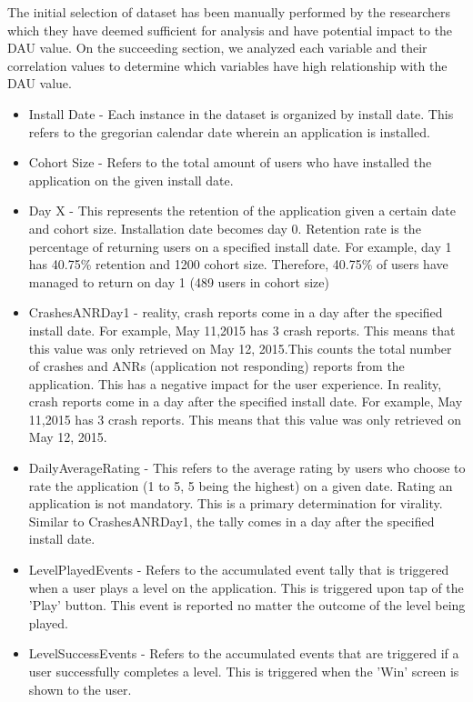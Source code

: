 The initial selection of dataset has been manually performed by the researchers which they have deemed sufficient for analysis and have potential impact to the DAU value. On the succeeding section, we analyzed each variable and their correlation values to determine which variables have high relationship with the DAU value.

\begin{itemize}
\item Install Date - Each instance in the dataset is organized by install date. This refers to the gregorian calendar date wherein an application is installed.
\item Cohort Size - Refers to the total amount of users who have installed the application on the given install date.
\item Day X - This represents the retention of the application given a certain date and cohort size. Installation date becomes day 0. Retention rate is the percentage of returning users on a specified install date. For example, day 1 has 40.75\% retention and 1200 cohort size. Therefore, 40.75\% of users have managed to return on day 1 (489 users in cohort size)
\item CrashesANRDay1 - reality, crash reports come in a day after the specified install date. For example, May 11,2015 has 3 crash reports. This means that this value was only retrieved on May 12, 2015.This counts the total number of crashes and ANRs (application not responding) reports from the application. This has a negative impact for the user experience. In reality, crash reports come in a day after the specified install date. For example, May 11,2015 has 3 crash reports. This means that this value was only retrieved on May 12, 2015.
\item DailyAverageRating - This refers to the average rating by users who choose to rate the application (1 to 5, 5 being the highest) on a given date. Rating an application is not mandatory. This is a primary determination for virality. Similar to CrashesANRDay1, the tally comes in a day after the specified install date.
\item LevelPlayedEvents - Refers to the accumulated event tally that is triggered when a user plays a level on the application. This is triggered upon tap of the 'Play' button. This event is reported no matter the outcome of the level being played.
\item LevelSuccessEvents - Refers to the accumulated events that are triggered if a user successfully completes a level. This is triggered when the 'Win' screen is shown to the user.

\end{itemize}
